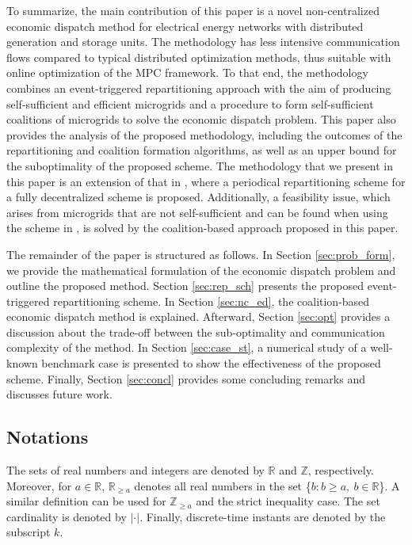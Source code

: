 To summarize, the main contribution of this paper is a novel non-centralized economic dispatch method for electrical energy networks with distributed generation and storage units. The methodology has less intensive communication flows compared to typical distributed optimization methods, thus suitable with online optimization of the MPC framework. To that end, the methodology combines an event-triggered repartitioning approach with the aim of producing self-sufficient and efficient microgrids and a procedure to form self-sufficient coalitions of microgrids to solve the economic dispatch problem. This paper also provides the analysis of the proposed methodology, including the outcomes of the repartitioning and coalition formation algorithms, as well as an upper bound for the suboptimality of the proposed scheme. %
The methodology that we present in this paper is an extension of that in \cite{ananduta2019a}, where a periodical repartitioning scheme for a fully decentralized scheme is proposed. Additionally, a feasibility issue, which arises from microgrids that are not self-sufficient and can be found when using the scheme in \cite{ananduta2019a}, is solved by the coalition-based approach proposed in this paper. 


The remainder of the paper is structured as follows. In Section \ref{sec:prob_form}, we provide the mathematical formulation of the economic dispatch problem and outline the proposed method. Section \ref{sec:rep_sch} presents the proposed event-triggered repartitioning scheme. In Section \ref{sec:nc_ed}, the coalition-based economic dispatch method is explained. Afterward, Section \ref{sec:opt} provides a discussion about the trade-off between the sub-optimality and communication complexity of the method. In Section \ref{sec:case_st}, a numerical study of a well-known benchmark case is presented to show the effectiveness of the proposed scheme. Finally, Section \ref{sec:concl} provides some concluding remarks and discusses future work. %

\vspace{-5pt}
\subsection*{Notations} 
\vspace{-10pt}
The sets of real numbers and integers are denoted by $\mathbb{R}$ and $\mathbb{Z}$, respectively. Moreover, for $a\in\mathbb{R}$, $\mathbb{R}_{\geq a}$ denotes all real numbers in the set \{$b: b\geq a, \ b \in \mathbb{R}$\}. A similar definition can be used for $\mathbb{Z}_{\geq a}$ and the strict inequality case. %
The set cardinality is denoted by $|\cdot|$. Finally, discrete-time instants are denoted by the subscript $k$.
